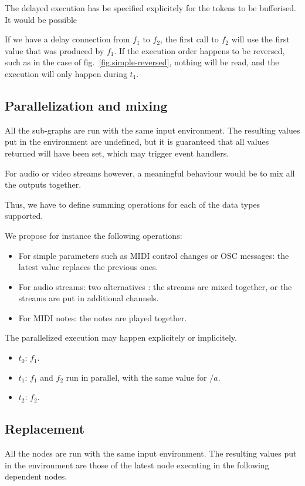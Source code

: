 \documentclass{article}
\begin{document}
    
The delayed execution has be specified explicitely for the tokens to be bufferised.
It would be possible
    
If we have a delay connection from $f_1$ to $f_2$, the first call to $f_2$ will use the first value that was produced by $f_1$.
If the execution order happens to be reversed, such as in the case of fig.~\ref{fig.simple-reversed}, nothing will be read, and the execution will only happen during $t_1$.
	
\subsection{Parallelization and mixing}
All the sub-graphs are run with the same input environment. 
The resulting values put in the environment are undefined, but it is guaranteed that all values returned will have been set, which may trigger event handlers.
    
For audio or video streams however, a meaningful behaviour would be to mix all the outputs together.
    
Thus, we have to define summing operations for each of the data types supported.
    
We propose for instance the following operations: 
\begin{itemize}
  \item For simple parameters such as MIDI control changes or OSC messages: the latest value replaces the previous ones.
  \item For audio streams: two alternatives : the streams are mixed together, or the streams are put in additional channels.
  \item For MIDI notes: the notes are played together.
\end{itemize}

The parallelized execution may happen explicitely or implicitely.

\begin{itemize}
  \item $t_0$: $f_1$.
  \item $t_1$: $f_1$ and $f_2$ run in parallel, with the same value for $/a$.
  \item $t_2$: $f_2$. 
\end{itemize}
     
\subsection{Replacement}
All the nodes are run with the same input environment. 
The resulting values put in the environment are those of the latest node executing in the following dependent nodes.
    
\end{document}
